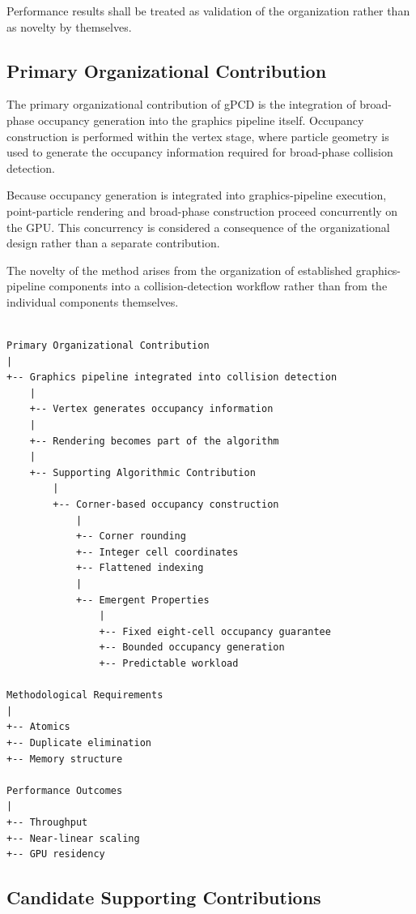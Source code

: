 Performance results shall be treated as validation of the organization
rather than as novelty by themselves.

\subsection{Primary Organizational Contribution}

The primary organizational contribution of gPCD is the integration of
broad-phase occupancy generation into the graphics pipeline itself.
Occupancy construction is performed within the vertex stage, where
particle geometry is used to generate the occupancy information required
for broad-phase collision detection.

Because occupancy generation is integrated into graphics-pipeline
execution, point-particle rendering and broad-phase construction proceed
concurrently on the GPU. This concurrency is considered a consequence of
the organizational design rather than a separate contribution.


The novelty of the method arises from the organization of established
graphics-pipeline components into a collision-detection workflow rather
than from the individual components themselves.
\newpage
\lstset{
  language=TeX,
  basicstyle=\ttfamily,
}

\begin{lstlisting}

Primary Organizational Contribution
|
+-- Graphics pipeline integrated into collision detection
	|
	+-- Vertex generates occupancy information
    |
    +-- Rendering becomes part of the algorithm
    |
    +-- Supporting Algorithmic Contribution
        |
        +-- Corner-based occupancy construction
            |
            +-- Corner rounding
            +-- Integer cell coordinates
            +-- Flattened indexing
            |
            +-- Emergent Properties
                |
                +-- Fixed eight-cell occupancy guarantee
                +-- Bounded occupancy generation
                +-- Predictable workload

Methodological Requirements
|
+-- Atomics
+-- Duplicate elimination
+-- Memory structure

Performance Outcomes
|
+-- Throughput
+-- Near-linear scaling
+-- GPU residency

\end{lstlisting}
\subsection{Candidate Supporting Contributions}


